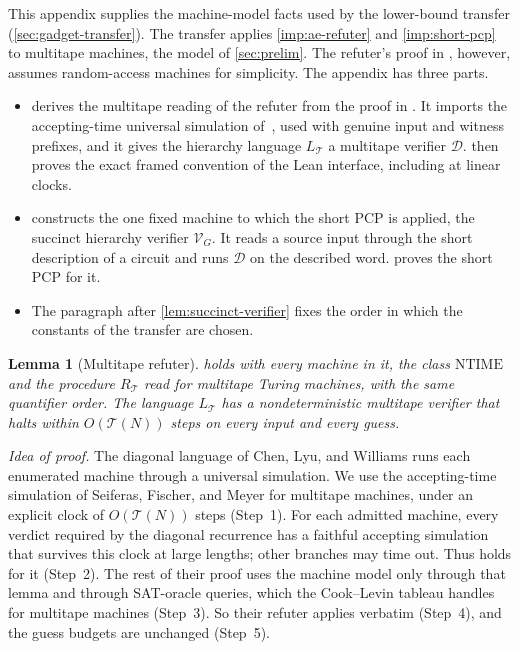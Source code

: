 \documentclass[11pt,letterpaper]{article}
\newtheorem{lemma}[theorem]{Lemma}
\theoremstyle{definition}
\theoremstyle{remark}
\newcommand{\NTIME}{\mathrm{NTIME}}
\newcommand{\Tclk}{\mathcal T}
\begin{document}
This appendix supplies the machine-model facts used by the lower-bound
transfer (\cref{sec:gadget-transfer}). The transfer applies \cref{imp:ae-refuter} and \cref{imp:short-pcp} to
multitape machines, the model of \cref{sec:prelim}. The refuter's
proof in \cite[Section~4]{CLW20}, however, assumes random-access
machines for simplicity. The appendix has three parts.
\begin{itemize}
\item {} derives the multitape reading of the
refuter from the proof in \cite[Section~4]{CLW20}. It imports the
accepting-time universal simulation of~\cite{SFM78,BGW70}, used with
genuine input and witness prefixes, and it gives
the hierarchy language \(L_{\Tclk}\) a multitape verifier
\(\mathcal D\).  then proves the exact framed
convention of the Lean interface, including at linear clocks.
\item {} constructs the one fixed machine to
which the short PCP is applied, the succinct hierarchy verifier
\(\mathcal V_G\). It reads a source input through the short description
of a circuit and runs \(\mathcal D\) on the described word.
 proves the short PCP for it.
\item The paragraph after \cref{lem:succinct-verifier} fixes the order
in which the constants of the transfer are chosen.
\end{itemize}

\begin{lemma}[Multitape refuter]\label{lem:multitape-refuter}
 holds with every machine in it, the class
\(\NTIME\) and the procedure \(R_{\Tclk}\) read for multitape Turing
machines, with the same quantifier order. The language \(L_{\Tclk}\) has a
nondeterministic multitape verifier that halts within \(O(\Tclk(N))\)
steps on every input and every guess.
\end{lemma}

\emph{Idea of proof.} The diagonal language of Chen, Lyu, and Williams
runs each enumerated machine through a universal simulation. We use the
accepting-time simulation of Seiferas, Fischer, and Meyer for multitape
machines, under an explicit clock of \(O(\Tclk(N))\) steps (Step~1).
For each admitted machine, every verdict required by the diagonal
recurrence has a faithful accepting simulation that survives this
clock at large lengths; other branches may time out. Thus
\cite[Lemma~4.3]{CLW20} holds for it (Step~2). The rest
of their proof uses the machine model only through that lemma and
through SAT-oracle queries, which the Cook--Levin tableau handles for
multitape machines (Step~3). So their refuter applies verbatim
(Step~4), and the guess budgets are unchanged (Step~5).
\end{document}
